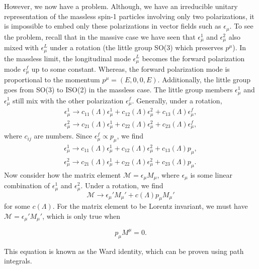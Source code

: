 \documentclass[11pt]{article}
\theoremstyle{definition}
\begin{document}
However, we now have a problem. Although, we have an irreducible unitary representation of the massless spin-1 particles involving only two polarizations, it is impossible to embed only these polarizations in vector fields such as $\epsilon_\mu$. To see the problem, recall that in the massive case we have seen that $\epsilon_\mu^1$ and $\epsilon_\mu^2$ also mixed with $\epsilon_\mu^L$ under a rotation (the little group SO(3) which preserves $p^\mu$). In the massless limit, the longitudinal mode $\epsilon_\mu^L$ becomes the forward polarization mode $\epsilon_\mu^f$ up to some constant. Whereas, the forward polarization mode is proportional to the momentum $p^\mu = (E, 0, 0, E)$. Additionally, the little group goes from SO(3) to ISO(2) in the massless case. The little group members $\epsilon_\mu^1$ and $\epsilon_\mu^1$ still mix with the other polarization $\epsilon_\mu^f$. Generally, under a rotation,
\begin{equation}
\begin{aligned}
        \epsilon_\mu^1 \rightarrow c_{11}(\Lambda)\epsilon_\mu^1 + c_{12}(\Lambda)\epsilon_\mu^2 + c_{13}(\Lambda)\epsilon_\mu^f,\\
        \epsilon_\mu^2 \rightarrow c_{21}(\Lambda)\epsilon_\mu^1 + c_{22}(\Lambda)\epsilon_\mu^2 + c_{23}(\Lambda)\epsilon_\mu^f,
\end{aligned}
\end{equation}
where $c_{ij}$ are numbers. Since $\epsilon_\mu^f \propto p_\mu$, we find
\begin{equation}
\begin{aligned}
        \epsilon_\mu^1 \rightarrow c_{11}(\Lambda)\epsilon_\mu^1 + c_{12}(\Lambda)\epsilon_\mu^2 + c_{13}(\Lambda)p_\mu,\\
        \epsilon_\mu^2 \rightarrow c_{21}(\Lambda)\epsilon_\mu^1 + c_{22}(\Lambda)\epsilon_\mu^2 + c_{23}(\Lambda)p_\mu.
\end{aligned}
\end{equation}
Now consider how the matrix element $\mathcal{M} = \epsilon_\mu M_\mu$, where $\epsilon_\mu$ is some linear combination of $\epsilon_\mu^1$ and $\epsilon_\mu^2$. Under a rotation, we find
\begin{equation}
    \mathcal{M} \rightarrow \epsilon_\mu'M_\mu' + c(\Lambda)p_\mu M_\mu'
\end{equation}
for some $c(\Lambda)$. For the matrix element to be Lorentz invariant, we must have $\mathcal{M} = \epsilon_\mu'M_\mu'$, which is only true when
\begin{shaded}
    \begin{equation}
        p_\mu M^\mu = 0.
    \end{equation}
\end{shaded}
This equation is known as the Ward identity, which can be proven using path integrals.
\end{document}
